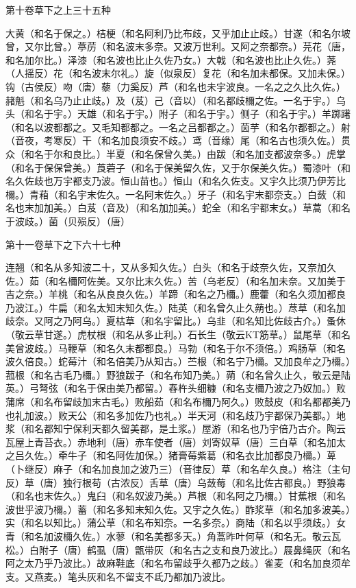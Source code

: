 \documentclass[a4paper,12pt,UTF8,twoside]{ctexbook}
\begin{document}
第十卷草下之上三十五种

大黄（和名于保之。）桔梗（和名阿利乃比布歧，又乎加止止歧。）甘遂（和名尔坡曾，又尔比曾。）葶苈（和名波末多奈。又波万世利。又阿之奈都奈。）芫花（唐，和名加尔比。）泽漆（和名波也比止久佐乃女。）大戟（和名波也比止久佐。）荛（人摇反）花（和名波末尔礼。）旋（似泉反）复花（和名加未都保。又加未保。）钩（古侯反）吻（唐）藜（力奚反）芦（和名也未宇波良。一名之之久比久佐。）赭魁（和名乌乃止止歧。）及（芨）己（音以）（和名都歧檷之佐。一名于宇。）乌头（和名于宇。）天雄（和名于宇。）附子（和名于宇。）侧子（和名于宇。）羊踯躇（和名以波都都之。又毛知都都之。一名之吕都都之。）茵芋（和名尔都都之。）射（音夜，考寒反）干（和名加良须安不歧。）鸢（音缘）尾（和名古也须久佐。）贯众（和名于尔和良比。）半夏（和名保曾久美。）由跋（和名加支都波奈多。）虎掌（和名于保保曾美。）莨菪子（和名于保美留久佐，又于尔保美久佐。）蜀漆叶（和名久佐歧也万宇都支乃波。恒山苗也。）恒山（和名久佐支。又宇久比须乃伊芳比檷。）青葙（和名宇末佐久。一名阿末佐久。）牙子（和名宇末都奈支。）白蔹（和名也末加加美。）白芨（音及）（和名加加美。）蛇全（和名宇都末女。）草蒿（和名于波歧。）菌（贝殒反）（唐）

第十一卷草下之下六十七种

连翘（和名从多知波二十，又从多知久佐。）白头（和名于歧奈久佐，又奈加久佐。）茹（和名檷阿佐美。又尔比末久佐。）苦（乌老反）（和名加未奈。又加美于吉之奈。）羊桃（和名从良良久佐。）羊蹄（和名之乃檷。）鹿藿（和名久须加都良乃波江。）牛扁（和名太知末知久佐。）陆英（和名曾久止久蒴也。）荩草（和名加歧奈。又阿之乃阿乌。）夏枯草（和名宇留比。）乌韭（和名知比佐歧古介。）蚤休（敬云草甘遂。）虎杖根（和名从多止利。）石长生（敬云KT筋草。）鼠尾草（和名美曾波歧。）马鞭草（和名久末都都良。）马勃（和名于尔不须倍。）鸡肠草（和名波久倍良。）蛇莓汁（和名倍美乃从知古。）苎根（和名宁乃檷。又加良牟之乃檷。）菰根（和名古毛乃檷。）野狼跋子（和名布知乃美。）蒴（和名曾久止久，敬云是陆英。）弓弩弦（和名于保由美乃都留。）舂杵头细糠（和名支檷乃波之乃奴加。）败蒲席（和名布留歧加末古毛。）败船茹（和名布檷乃阿久。）败鼓皮（和名都都美乃也礼加波。）败天公（和名多加佐乃也礼。）半天河（和名歧乃宇都保乃美都。）地浆（和名都知宁保利天都久留美都，是土浆。）屋游（和名也乃宇倍乃古介。陶云瓦屋上青苔衣。）赤地利（唐）赤车使者（唐）刘寄奴草（唐）三白草（和名加太之吕久佐。）牵牛子（和名阿佐加保。）猪膏莓紫葛（和名衣比加都良乃檷。）萆（卜继反）麻子（和名加良加之波乃三）（音律反）草（和名牟久良。）格注（主句反）草（唐）独行根苟（古浓反）舌草（唐）乌蔹莓（和名比佐古都良。）野狼毒（和名也末佐久。）鬼臼（和名奴波乃美。）芦根（和名阿之乃檷。）甘蕉根（和名波世乎波乃檷。）蓄（和名多知末知久佐。又宇之久佐。）酢浆草（和名加多波美。）实（和名以知比。）蒲公草（和名布知奈。一名多奈。）商陆（和名以乎须歧。）女青（和名加波檷久佐。）水蓼（和名美都多天。）角蒿昨叶何草（和名无。敬云瓦松。）白附子（唐）鹤虱（唐）甑带灰（和名古之支和良乃波比。）屐鼻绳灰（和名阿之太乃乎乃波比。）故麻鞋底（和名布留歧乎久都乃之歧。）雀麦（和名加良须牟支。又燕麦。）笔头灰和名不留支不氐乃都加乃波比。
\end{document}
